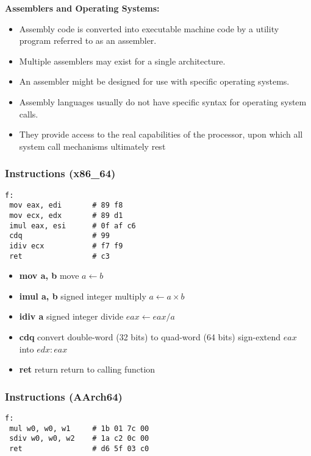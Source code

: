 \documentclass[12pt]{article}
\begin{document}
\textbf{Assemblers and Operating Systems:}
\begin{itemize}
    \item Assembly code is converted into executable machine code by a utility program referred to as an assembler.
    \item Multiple assemblers may exist for a single architecture.
    \item An assembler might be designed for use with specific operating systems.
    \item Assembly languages usually do not have specific syntax for operating system calls.
    \item They provide access to the real capabilities of the processor, upon which all system call mechanisms ultimately rest
\end{itemize}


\subsubsection{Instructions (x86\_64)}

\begin{lstlisting}
f:
 mov eax, edi       # 89 f8
 mov ecx, edx       # 89 d1
 imul eax, esi      # 0f af c6
 cdq                # 99
 idiv ecx           # f7 f9
 ret                # c3
\end{lstlisting}

\begin{itemize}
  \item \textbf{mov a, b} \qquad move \hfill $a \gets b$
  \item \textbf{imul a, b} \qquad signed integer multiply \hfill $a \gets a \times b$
  \item \textbf{idiv a} \qquad signed integer divide \hfill $eax \gets eax / a$
  \item \textbf{cdq} \qquad convert double-word (32 bits) to quad-word (64 bits) \hfill sign-extend $eax$ into $edx:eax$
  \item \textbf{ret} \qquad return \hfill return to calling function
\end{itemize}

\subsubsection{Instructions (AArch64)}

\begin{lstlisting}
f:
 mul w0, w0, w1     # 1b 01 7c 00
 sdiv w0, w0, w2    # 1a c2 0c 00
 ret                # d6 5f 03 c0
\end{lstlisting}
\end{document}
